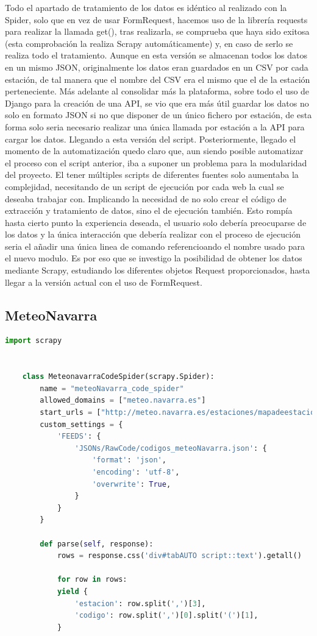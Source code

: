 Todo el apartado de tratamiento de los datos es idéntico al realizado con la Spider, solo que en vez de usar FormRequest, hacemos uso de la librería requests para realizar la llamada get(), tras realizarla, se comprueba que haya sido exitosa (esta comprobación la realiza Scrapy automáticamente) y, en caso de serlo se realiza todo el tratamiento.\newline
\newline
Aunque en esta versión se almacenan todos los datos en un mismo JSON, originalmente los datos eran guardados en un CSV por cada estación, de tal manera que el nombre del CSV era el mismo que el de la estación perteneciente. Más adelante al consolidar más la plataforma, sobre todo el uso de Django para la creación de una API, se vio que era más útil guardar los datos no solo en formato JSON si no que disponer de un único fichero por estación, de esta forma solo seria necesario realizar una única llamada por estación a la API para cargar los datos. Llegando a esta versión del script.\newline
\newline
Posteriormente, llegado el momento de la automatización quedo claro que, aun siendo posible automatizar el proceso con el script anterior, iba a suponer un problema para la modularidad del proyecto. El tener múltiples scripts de diferentes fuentes solo aumentaba la complejidad, necesitando de un script de ejecución por cada web la cual se deseaba trabajar con. Implicando la necesidad de no solo crear el código de extracción y tratamiento de datos, sino el de ejecución también. Esto rompía hasta cierto punto la experiencia deseada, el usuario solo debería preocuparse de los datos y la única interacción que debería realizar con el proceso de ejecución seria el añadir una única linea de comando referencioando el nombre usado para el nuevo modulo.\newline
\newline
Es por eso que se investigo la posibilidad de obtener los datos mediante Scrapy, estudiando los diferentes objetos Request proporcionados, hasta llegar a la versión actual con el uso de FormRequest.

\subsection{MeteoNavarra}

\begin{lstlisting}[language=Python, caption={MeteoNavarra Code Spider}]
	import scrapy
	
	
	class MeteonavarraCodeSpider(scrapy.Spider):
		name = "meteoNavarra_code_spider"
		allowed_domains = ["meteo.navarra.es"]
		start_urls = ["http://meteo.navarra.es/estaciones/mapadeestaciones.cfm#"]
		custom_settings = {
			'FEEDS': {
				'JSONs/RawCode/codigos_meteoNavarra.json': {
					'format': 'json',
					'encoding': 'utf-8',
					'overwrite': True,
				}
			}
		}
		
		def parse(self, response):
			rows = response.css('div#tabAUTO script::text').getall()
			
			for row in rows:
			yield {
				'estacion': row.split(',')[3],
				'codigo': row.split(',')[0].split('(')[1],
			}
\end{lstlisting}

